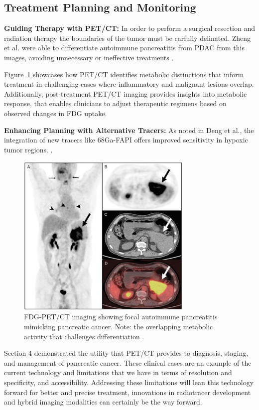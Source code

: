 
\subsection{Treatment Planning and Monitoring}

\textbf{Guiding Therapy with PET/CT:} In order to perform a surgical resection and radiation therapy the boundaries of the tumor must be carfully delinated. Zheng et al. were able to differentiate autoimmune pancreatitis from PDAC from this images, avoiding unnecessary or ineffective treatments \cite{Zheng2018}.

Figure~\ref{fig:Zheng1} showcases how PET/CT identifies metabolic distinctions that inform treatment in challenging cases where inflammatory and malignant lesions overlap. Additionally, post-treatment PET/CT imaging provides insights into metabolic response, that enables clinicians to adjust therapeutic regimens based on observed changes in FDG uptake.

\textbf{Enhancing Planning with Alternative Tracers:} As noted in Deng et al., the integration of new tracers like 68Ga-FAPI offers improved sensitivity in hypoxic tumor regions. \cite{Deng2021}.

\begin{figure}[H]
	\centering
	\includegraphics[width=0.75\textwidth]{assets/Zheng1.png}
	\caption{FDG-PET/CT imaging showing focal autoimmune pancreatitis mimicking pancreatic cancer. Note: the overlapping metabolic activity that challenges differentiation \cite{Zheng2018}.}
	\label{fig:Zheng1}
\end{figure}


Section 4 demonstrated the utility that PET/CT provides to diagnosis, staging, and management of pancreatic cancer. These clinical cases are an example of the current technology and limitations that we have in terms of resolution and specificity, and accessibility. Addressing these limitations will lean this technology forward for better and precise treatment, innovations in radiotracer development and hybrid imaging modalities can certainly be the way forward.
